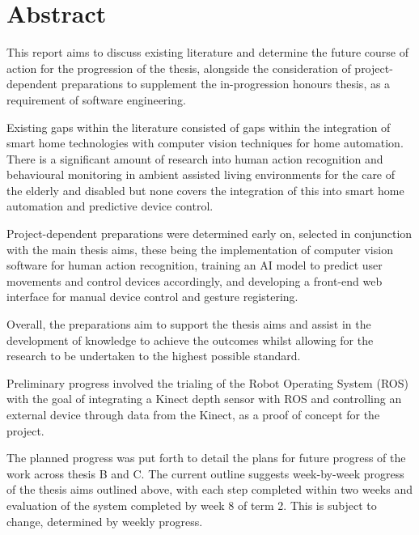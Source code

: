 \chapter*{Abstract}\label{abstract}
This report aims to discuss existing literature and determine the future course of action for the progression of the thesis, alongside the consideration of project-dependent preparations to supplement the in-progression honours thesis, as a requirement of software engineering. 

Existing gaps within the literature consisted of gaps within the integration of smart home technologies with computer vision techniques for home automation.
There is a significant amount of research into human action recognition and behavioural monitoring in ambient assisted living environments for the care of the elderly and disabled but none covers the integration of this into smart home automation and predictive device control.

Project-dependent preparations were determined early on, selected in conjunction with the main thesis aims, these being the implementation of computer vision software for human action recognition, training an AI model to predict user movements and control devices accordingly, and developing a front-end web interface for manual device control and gesture registering.

Overall, the preparations aim to support the thesis aims and assist in the development of knowledge to achieve the outcomes whilst allowing for the research to be undertaken to the highest possible standard. 

Preliminary progress involved the trialing of the Robot Operating System (ROS) with the goal of integrating a Kinect depth sensor with ROS and controlling an external device through data from the Kinect, as a proof of concept for the project.

The planned progress was put forth to detail the plans for future progress of the work across thesis B and C. The current outline suggests week-by-week progress of the thesis aims outlined above, with each step completed within two weeks and evaluation of the system completed by week 8 of term 2. This is subject to change, determined by weekly progress.